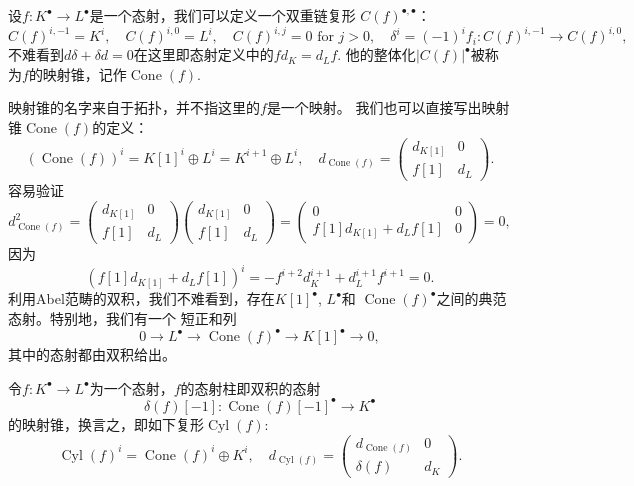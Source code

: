\begin{para}[映射锥]
    设$f:K^\bullet\to L^\bullet$是一个态射，我们可以定义一个双重链复形
    $C(f)^{\bullet,\bullet}$：
    \[
        C(f)^{i,-1}=K^i,\quad C(f)^{i,0}=L^i,\quad 
        C(f)^{i,j}=0\,\,\text{for $j>0$},\quad 
        \delta^i=(-1)^i f_i:C(f)^{i,-1}\to C(f)^{i,0},
    \]
    不难看到$d\delta +\delta d=0$在这里即态射定义中的$fd_K=d_Lf$.
    他的整体化$|C(f)|^\bullet$被称为$f$的映射锥，记作$\operatorname{Cone}(f)$.
\end{para}

映射锥的名字来自于拓扑，并不指这里的$f$是一个映射。
我们也可以直接写出映射锥$\operatorname{Cone}(f)$的定义：
\[
    (\operatorname{Cone}(f))^i=K[1]^i\oplus L^i=K^{i+1}\oplus L^i,\quad
    d_{\operatorname{Cone}(f)}=\begin{pmatrix}
        d_{K[1]}&0\\
        f[1]&d_L
    \end{pmatrix}.
\]
容易验证
\[
	d_{\operatorname{Cone}(f)}^2=\begin{pmatrix}
		d_{K[1]}&0\\
		f[1]&d_L
	\end{pmatrix}\begin{pmatrix}
		d_{K[1]}&0\\
		f[1]&d_L
	\end{pmatrix}
	=\begin{pmatrix}
		0&0\\
		f[1]d_{K[1]}+d_Lf[1]&0
	\end{pmatrix}
	=0,
\]
因为
\[
	(f[1]d_{K[1]}+d_Lf[1])^i =
	-f^{i+2}d_K^{i+1}+d_L^{i+1} f^{i+1}=0.
\]
利用Abel范畴的双积，我们不难看到，存在$K[1]^\bullet$, $L^\bullet$和
$\operatorname{Cone}(f)^\bullet$之间的典范态射。特别地，我们有一个
短正和列
\[
    0\to L^\bullet\to \operatorname{Cone}(f)^\bullet\to K[1]^\bullet \to 0,
\]
其中的态射都由双积给出。

\begin{para}[映射柱]
	令$f:K^\bullet\to L^\bullet$为一个态射，$f$的态射柱即双积的态射
	\[
		\delta(f)[-1]:\operatorname{Cone}(f)[-1]^\bullet \to K^\bullet
	\]
    的映射锥，换言之，即如下复形$\operatorname{Cyl}(f)$:
	\[
		\operatorname{Cyl}(f)^i=\operatorname{Cone}(f)^i\oplus K^{i} ,\quad
		d_{\operatorname{Cyl}(f)}=\begin{pmatrix}
			d_{\operatorname{Cone}(f)}&0\\
			\delta(f) & d_{K}
		\end{pmatrix}.
	\]
\end{para}


